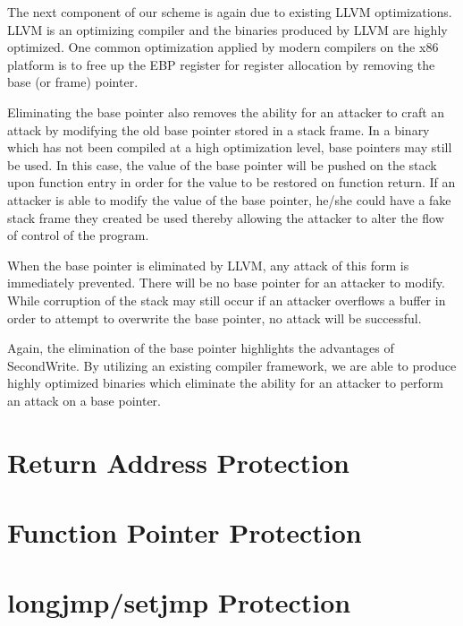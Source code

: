 The next component of our scheme is again due to existing LLVM optimizations. LLVM is an optimizing
compiler and the binaries produced by LLVM are highly optimized. One common optimization applied by
modern compilers on the x86 platform is to free up the EBP register for register allocation by
removing the base (or frame) pointer.

Eliminating the base pointer also removes the ability for an attacker to craft an attack by
modifying the old base pointer stored in a stack frame. In a binary which has not been compiled at a
high optimization level, base pointers may still be used. In this case, the value of the base
pointer will be pushed on the stack upon function entry in order for the value to be restored on
function return. If an attacker is able to modify the value of the base pointer, he/she could have a
fake stack frame they created be used thereby allowing the attacker to alter the flow of control of
the program.

When the base pointer is eliminated by LLVM, any attack of this form is immediately prevented. There
will be no base pointer for an attacker to modify. While corruption of the stack may still occur if
an attacker overflows a buffer in order to attempt to overwrite the base pointer, no attack will be
successful.

Again, the elimination of the base pointer highlights the advantages of SecondWrite. By utilizing an
existing compiler framework, we are able to produce highly optimized binaries which eliminate the
ability for an attacker to perform an attack on a base pointer.

\section{Return Address Protection}

\section{Function Pointer Protection}

\section{longjmp/setjmp Protection}
